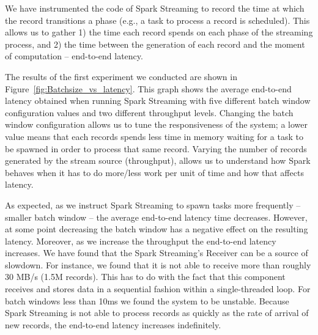 We have instrumented the code of Spark Streaming to record the time at which the record transitions a phase (e.g., a task to process a record is scheduled).
This allows us to gather 1) the time each record spends on each phase of the streaming process, and 2) the time between the generation of each record and the moment of computation -- end-to-end latency.


The results of the first experiment we conducted are shown in Figure~\ref{fig:Batchsize_vs_latency}.
This graph shows the average end-to-end latency obtained when running Spark Streaming with five different batch window configuration values and two different throughput levels.
Changing the batch window configuration allows us to tune the responsiveness of the system;
a lower value means that each records spends less time in memory waiting for a task to be spawned in order to process that same record. 
Varying the number of records generated by the stream source (throughput), allows us to understand how 
Spark behaves when it has to do more/less work per unit of time and how that affects latency.

As expected, as we instruct Spark Streaming to spawn tasks more frequently -- smaller batch window -- the average end-to-end latency time decreases.
However, at some point decreasing the batch window has a negative effect on the resulting latency.
Moreover, as we increase the throughput the end-to-end latency increases.
We have found that the Spark Streaming's Receiver can be a source of slowdown.
For instance, we found that it is not able to receive more than roughly 30 MB/s (1.5M records).
This has to do with the fact that this component receives and stores data in a sequential fashion within a single-threaded loop.
For batch windows less than 10ms we found the system to be unstable. 
Because Spark Streaming is not able to process records as quickly as the rate of arrival of new records, the end-to-end latency increases indefinitely.

